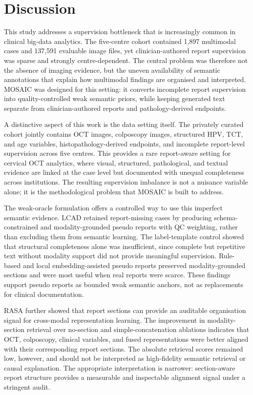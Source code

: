 \documentclass[11pt, a4paper]{article}
\theoremstyle{plain}
\theoremstyle{definition}
\begin{document}
\section{Discussion}
\label{sec:discussion}

This study addresses a supervision bottleneck that is increasingly common in clinical big-data analytics. The five-centre cohort contained 1,897 multimodal cases and 137,591 evaluable image files, yet clinician-authored report supervision was sparse and strongly centre-dependent. The central problem was therefore not the absence of imaging evidence, but the uneven availability of semantic annotations that explain how multimodal findings are organised and interpreted. MOSAIC was designed for this setting: it converts incomplete report supervision into quality-controlled weak semantic priors, while keeping generated text separate from clinician-authored reports and pathology-derived endpoints.

A distinctive aspect of this work is the data setting itself. The privately curated cohort jointly contains OCT images, colposcopy images, structured HPV, TCT, and age variables, histopathology-derived endpoints, and incomplete report-level supervision across five centres. This provides a rare report-aware setting for cervical OCT analytics, where visual, structured, pathological, and textual evidence are linked at the case level but documented with unequal completeness across institutions. The resulting supervision imbalance is not a nuisance variable alone; it is the methodological problem that MOSAIC is built to address.

The weak-oracle formulation offers a controlled way to use this imperfect semantic evidence. LCAD retained report-missing cases by producing schema-constrained and modality-grounded pseudo reports with QC weighting, rather than excluding them from semantic learning. The label-template control showed that structural completeness alone was insufficient, since complete but repetitive text without modality support did not provide meaningful supervision. Rule-based and local embedding-assisted pseudo reports preserved modality-grounded sections and were most useful when real reports were scarce. These findings support pseudo reports as bounded weak semantic anchors, not as replacements for clinical documentation.

RASA further showed that report sections can provide an auditable organisation signal for cross-modal representation learning. The improvement in modality-section retrieval over no-section and simple-concatenation ablations indicates that OCT, colposcopy, clinical variables, and fused representations were better aligned with their corresponding report sections. The absolute retrieval scores remained low, however, and should not be interpreted as high-fidelity semantic retrieval or causal explanation. The appropriate interpretation is narrower: section-aware report structure provides a measurable and inspectable alignment signal under a stringent audit.
\end{document}

